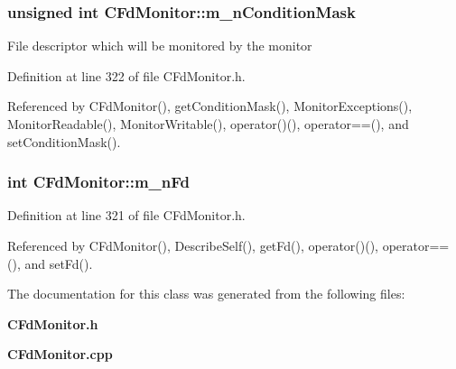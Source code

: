 \subsubsection{\setlength{\rightskip}{0pt plus 5cm}unsigned int CFd\-Monitor::m\_\-n\-Condition\-Mask\hspace{0.3cm}{\tt  [private]}}\label{classCFdMonitor_o1}


File descriptor which will be monitored by the monitor 

Definition at line 322 of file CFd\-Monitor.h.

Referenced by CFd\-Monitor(), get\-Condition\-Mask(), Monitor\-Exceptions(), Monitor\-Readable(), Monitor\-Writable(), operator()(), operator==(), and set\-Condition\-Mask().
\subsubsection{\setlength{\rightskip}{0pt plus 5cm}int CFd\-Monitor::m\_\-n\-Fd\hspace{0.3cm}{\tt  [private]}}\label{classCFdMonitor_o0}




Definition at line 321 of file CFd\-Monitor.h.

Referenced by CFd\-Monitor(), Describe\-Self(), get\-Fd(), operator()(), operator==(), and set\-Fd().

The documentation for this class was generated from the following files:\begin{CompactItemize}
\item 
{\bf CFd\-Monitor.h}\item 
{\bf CFd\-Monitor.cpp}\end{CompactItemize}
